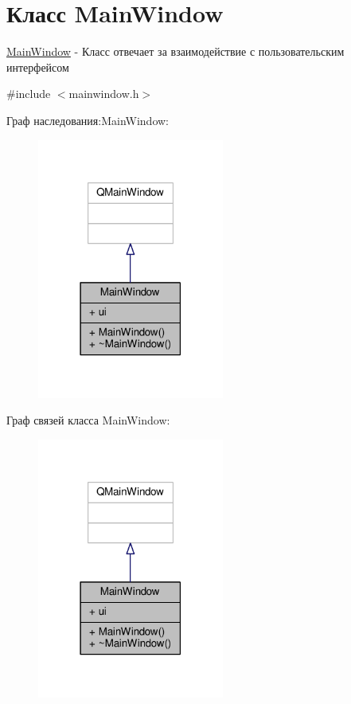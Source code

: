 \hypertarget{class_main_window}{}\section{Класс Main\+Window}
\label{class_main_window}


\hyperlink{class_main_window}{Main\+Window} -\/ Класс отвечает за взаимодействие с пользовательским интерфейсом  




{\ttfamily \#include $<$mainwindow.\+h$>$}



Граф наследования\+:Main\+Window\+:\nopagebreak
\begin{figure}[H]
\begin{center}
\leavevmode
\includegraphics[width=174pt]{class_main_window__inherit__graph}
\end{center}
\end{figure}


Граф связей класса Main\+Window\+:\nopagebreak
\begin{figure}[H]
\begin{center}
\leavevmode
\includegraphics[width=174pt]{class_main_window__coll__graph}
\end{center}
\end{figure}

